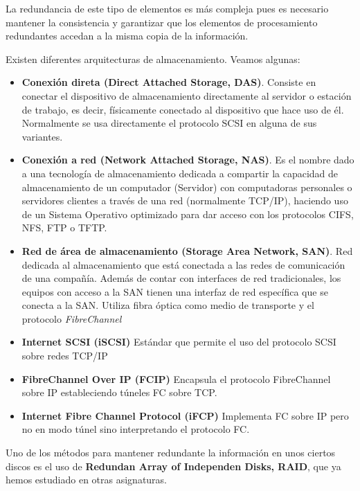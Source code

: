 La redundancia de este tipo de elementos es más compleja pues es necesario mantener la consistencia y garantizar que los elementos de procesamiento redundantes accedan a la misma copia de la información.

Existen diferentes arquitecturas de almacenamiento. Veamos algunas:
\begin{itemize}
\item \textbf{Conexión direta (Direct Attached Storage, DAS)}. Consiste en conectar el dispositivo de almacenamiento directamente al servidor o estación de trabajo, es decir, físicamente conectado al dispositivo que hace uso de él. Normalmente se usa directamente el protocolo SCSI en alguna de sus variantes.

\item \textbf{Conexión a red (Network Attached Storage, NAS)}. Es el nombre dado a una tecnología de almacenamiento dedicada a compartir la capacidad de almacenamiento de un computador (Servidor) con computadoras personales o servidores clientes a través de una red (normalmente TCP/IP), haciendo uso de un Sistema Operativo optimizado para dar acceso con los protocolos CIFS, NFS, FTP o TFTP.

\item \textbf{Red de área de almacenamiento (Storage Area Network, SAN)}. Red dedicada al almacenamiento que está conectada a las redes de comunicación de una compañía. Además de contar con interfaces de red tradicionales, los equipos con acceso a la SAN tienen una interfaz de red específica que se conecta a la SAN. Utiliza fibra óptica como medio de transporte y el protocolo \textit{FibreChannel}

\item \textbf{Internet SCSI (iSCSI)} Estándar que permite el uso del protocolo SCSI sobre redes TCP/IP

\item \textbf{FibreChannel Over IP (FCIP)} Encapsula el protocolo FibreChannel sobre IP estableciendo túneles FC sobre TCP.

\item \textbf{Internet Fibre Channel Protocol (iFCP)} Implementa FC sobre IP pero no en modo túnel sino interpretando el protocolo FC.
\end{itemize}

Uno de los métodos para mantener redundante la información en unos ciertos discos es el uso de \textbf{Redundan Array of Independen Disks, RAID}, que ya hemos estudiado en otras asignaturas.

